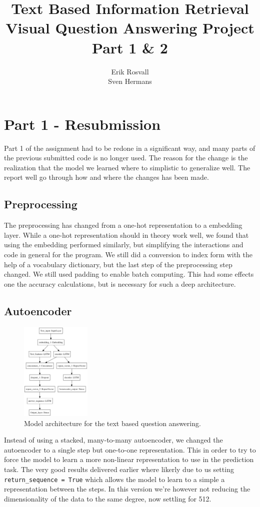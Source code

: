 \documentclass[10pt,a4paper]{report}
\author{Erik Rosvall \\ Sven Hermans}
\title{Text Based Information Retrieval \\ Visual Question Answering Project \\ Part 1 \& 2}
\begin{document}
	\maketitle
	\section*{Part 1 - Resubmission}
		Part 1 of the assignment had to be redone in a significant way, and many parts of the previous submitted code is no longer used. The reason for the change is the realization that the model we learned where to simplistic to generalize well. The report well go through how and where the changes has been made.
	\subsection*{Preprocessing}
		The preprocessing has changed from a one-hot representation to a embedding layer. While a one-hot representation should in theory work well, we found that using the embedding performed similarly, but simplifying the interactions and code in general for the program. We still did a conversion to index form with the help of a vocabulary dictionary, but the last step of the preprocessing step changed. We still used padding to enable batch computing. This had some effects one the accuracy calculations, but is necessary for such a deep architecture.
	\subsection*{Autoencoder}
		\begin{figure}
		\begin{center}
			\includegraphics[width=0.3\textwidth]{text_classifier_w_autoencoder.png}
		\end{center}
		\caption{Model architecture for the text based question answering. \label{text_classifier_w_autoencoder}}
	\end{figure}
	Instead of using a stacked, many-to-many autoencoder, we changed the autoencoder to a single step but one-to-one representation. This in order to try to force the model to learn a more non-linear representation to use in the prediction task. The very good results delivered earlier where likerly due to us setting \texttt{return\_sequence = True} which allows the model to learn to a simple a representation between the steps. In this version we're however not reducing the dimensionality of the data to the same degree, now settling for 512.
\end{document}
